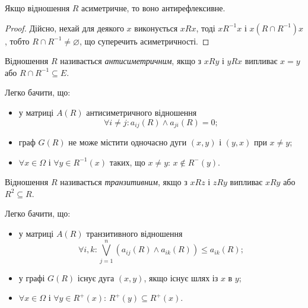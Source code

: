 \begin{proposition}
	Якщо відношення $R$ асиметричне, то воно антирефлексивне.
\end{proposition}

\begin{proof}
	Дійсно, нехай для деякого $x$ виконується $x R x$, тоді $x R^{-1} x$ і $x (R\cap R^{-1}) x$, тобто $R \cap R^{-1} \ne \varnothing$, що суперечить асиметричності.
\end{proof}

\begin{definition}
	Відношення $R$ називається \textit{антисиметричним}, якщо з $x R y$ і $y R x$ випливає $x = y$ або $R \cap R^{-1} \subseteq E$.
\end{definition}

\begin{properties}
	Легко бачити, що:
	\begin{itemize}
		\item у матриці $A(R)$ антисиметричного відношення \begin{equation}\forall i \ne j: a_{ij}(R) \land a_{ji}(R) = 0;\end{equation}
		\item граф $G(R)$ не може містити одночасно дуги $(x, y)$ і $(y, x)$ при $x \ne y$; 
		\item $\forall x \in \Omega$ і $\forall y \in R^{-1}(x)$ таких, що $x \ne y$: $x \notin R^-(y)$.
	\end{itemize}
\end{properties}

\begin{definition}
	Відношення $R$ називається \textit{транзитивним}, якщо з $x R z$ і $z R y$ випливає $x R y$ або $R^2 \subseteq R$.
\end{definition}

\begin{properties}
	Легко бачити, що:
	\begin{itemize}
		\item у матриці $A(R)$ транзитивного відношення \begin{equation}\forall i, k: \bigvee\limits_{j = 1}^n (a_{ij}(R) \land a_{ik}(R)) \le a_{ik}(R);\end{equation}
		\item у графі $G(R)$ існує дуга $(x, y)$, якщо існує шлях із $x$ в $y$;
		\item $\forall x \in \Omega$ і $\forall y \in R^+(x)$: $R^+(y) \subseteq R^+(x)$.
	\end{itemize}
\end{properties}

